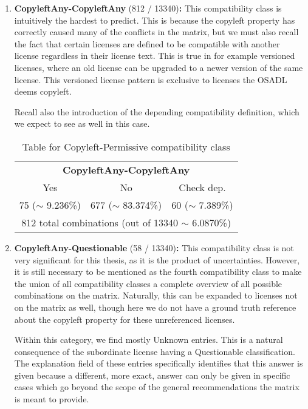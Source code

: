 \begin{enumerate}
	\item \textbf{CopyleftAny-CopyleftAny} (812 / 13340)\textbf{:} This compatibility class is intuitively the hardest to predict. This is because the copyleft property has correctly caused many of the conflicts in the matrix, but we must also recall the fact that certain licenses are defined to be compatible with another license regardless in their license text. This is true in for example versioned licenses, where an old license can be upgraded to a newer version of the same license. This versioned license pattern is exclusive to licenses the OSADL deems copyleft.
	
	Recall also the introduction of the depending compatibility definition, which we expect to see as well in this case.
	
	\begin{table}[h]
		\caption{Table for Copyleft-Permissive compatibility class}
		\label{tab:copyleft-copyleft-table}
		\centering
		\begin{tabular}{|c|c|c|}
			\hline
			\multicolumn{3}{|c|}{\textbf{CopyleftAny-CopyleftAny}} \\
			Yes & No & Check dep. \\
			75 ($\sim$ 9.236\%) & 677 ($\sim$ 83.374\%) & 60 ($\sim$ 7.389\%) \\\hline
			\multicolumn{3}{|c|}{812 total combinations (out of 13340 $\sim$ 6.0870\%)} \\
			\hline
		\end{tabular}
	\end{table}
	
	\item \textbf{CopyleftAny-Questionable} (58 / 13340)\textbf{:} This compatibility class is not very significant for this thesis, as it is the product of uncertainties. However, it is still necessary to be mentioned as the fourth compatibility class to make the union of all compatibility classes a complete overview of all possible combinations on the matrix. Naturally, this can be expanded to licenses not on the matrix as well, though here we do not have a ground truth reference about the copyleft property for these unreferenced licenses.
	
	Within this category, we find mostly Unknown entries. This is a natural consequence of the subordinate license having a Questionable classification. The explanation field of these entries specifically identifies that this answer is given because a different, more exact, answer can only be given in specific cases which go beyond the scope of the general recommendations the matrix is meant to provide.
	

\end{enumerate}
